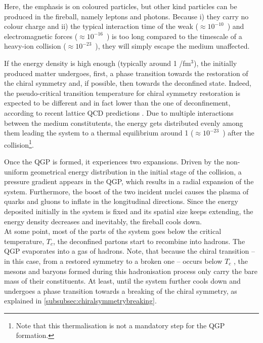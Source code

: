 Here, the emphasis is on coloured particles, but other kind particles can be produced in the fireball, namely leptons and photons. Because i) they carry no colour charge and ii) the typical interaction time of the weak ($\approx 10^{-10}$~\second) and electromagnetic forces ($\approx 10^{-16}$~\second) is too long compared to the timescale of a heavy-ion collision ($\approx 10^{-23}$~\second), they will simply escape the medium unaffected.



If the energy density is high enough (typically around 1 \gev/fm$^{3}$), the initially produced matter undergoes, first, a phase transition towards the restoration of the chiral symmetry and, if possible, then towards the deconfined state.
Indeed, the pseudo-critical transition temperature for chiral symmetry restoration is expected to be different and in fact lower than the one of deconfinement, according to recent lattice QCD predictions \cite{dingChiralPhaseTransition2019}.
Due to multiple interactions between the medium constitutents, the energy gets distributed evenly among them leading the system to a thermal equilibrium around 1 \fmC ($\approx 10^{-23}$~\second) after the collision\footnote{Note that this thermalisation is not a mandatory step for the QGP formation.}.

Once the QGP is formed, it experiences two expansions. Driven by the non-uniform geometrical energy distribution in the initial stage of the collision, a pressure gradient appears in the QGP, which results in a radial expansion of the system. Furthermore, the boost of the two incident nuclei causes the plasma of quarks and gluons to inflate in the longitudinal directions. Since the energy deposited initially in the system is fixed and its spatial size keeps extending, the energy density decreases and inevitably, the fireball cools down.\\

At some point, most of the parts of the system goes below the critical temperature, $T_{c}$, the deconfined partons start to recombine into hadrons. The QGP evaporates into a gas of hadrons. Note, that because the chiral transition -- in this case, from a restored symmetry to a broken one -- occurs below $T_{c}$ \cite{dingChiralPhaseTransition2019}, the mesons and baryons formed during this hadronisation process only carry the bare mass of their constituents. At least, until the system further cools down and undergoes a phase transition towards a breaking of the chiral symmetry, as explained in \Sec\ref{subsubsec:chiralsymmetrybreaking}.

